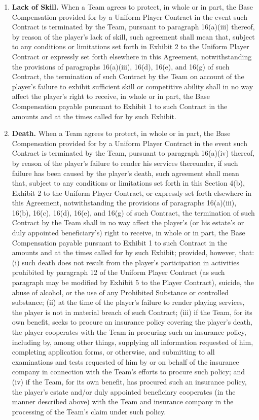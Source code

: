 \documentclass[
]{book}
\providecommand{\tightlist}{%
  \setlength{\itemsep}{0pt}\setlength{\parskip}{0pt}}
\begin{document}
\begin{enumerate}
\def\labelenumi{(\alph{enumi})}
\tightlist
\item
  \textbf{Lack of Skill.} When a Team agrees to protect, in whole or in part, the Base Compensation provided for by a Uniform Player Contract in the event such Contract is terminated by the Team, pursuant to paragraph 16(a)(iii) thereof, by reason of the player's lack of skill, such agreement shall mean that, subject to any conditions or limitations set forth in Exhibit 2 to the Uniform Player Contract or expressly set forth elsewhere in this Agreement, notwithstanding the provisions of paragraphs 16(a)(iii), 16(d), 16(e), and 16(g) of such Contract, the termination of such Contract by the Team on account of the player's failure to exhibit sufficient skill or competitive ability shall in no way affect the player's right to receive, in whole or in part, the Base Compensation payable pursuant to Exhibit 1 to such Contract in the amounts and at the times called for by such Exhibit.
\item
  \textbf{Death.} When a Team agrees to protect, in whole or in part, the Base Compensation provided for by a Uniform Player Contract in the event such Contract is terminated by the Team, pursuant to paragraph 16(a)(iv) thereof, by reason of the player's failure to render his services thereunder, if such failure has been caused by the player's death, such agreement shall mean that, subject to any conditions or limitations set forth in this Section 4(b), Exhibit 2 to the Uniform Player Contract, or expressly set forth elsewhere in this Agreement, notwithstanding the provisions of paragraphs 16(a)(iii), 16(b), 16(c), 16(d), 16(e), and 16(g) of such Contract, the termination of such Contract by the Team shall in no way affect the player's (or his estate's or duly appointed beneficiary's) right to receive, in whole or in part, the Base Compensation payable pursuant to Exhibit 1 to such Contract in the amounts and at the times called for by such Exhibit; provided, however, that: (i) such death does not result from the player's participation in activities prohibited by paragraph 12 of the Uniform Player Contract (as such paragraph may be modified by Exhibit 5 to the Player Contract), suicide, the abuse of alcohol, or the use of any Prohibited Substance or controlled substance; (ii) at the time of the player's failure to render playing services, the player is not in material breach of such Contract; (iii) if the Team, for its own benefit, seeks to procure an insurance policy covering the player's death, the player cooperates with the Team in procuring such an insurance policy, including by, among other things, supplying all information requested of him, completing application forms, or otherwise, and submitting to all examinations and tests requested of him by or on behalf of the insurance company in connection with the Team's efforts to procure such policy; and (iv) if the Team, for its own benefit, has procured such an insurance policy, the player's estate and/or duly appointed beneficiary cooperates (in the manner described above) with the Team and insurance company in the processing of the Team's claim under such policy.

\end{enumerate}
\end{document}

